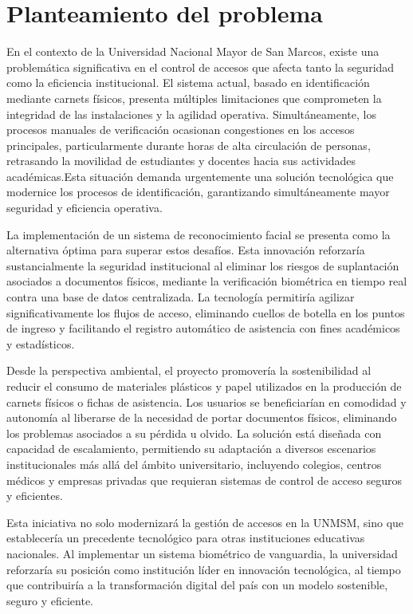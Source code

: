 \documentclass[12pt]{article}
\begin{document}
{%
\section{Planteamiento del problema}
En el contexto de la Universidad Nacional Mayor de San Marcos, existe una problemática significativa en el control de accesos que afecta tanto la seguridad como la eficiencia institucional. El sistema actual, basado en identificación mediante carnets físicos, presenta múltiples limitaciones que comprometen la integridad de las instalaciones y la agilidad operativa. Simultáneamente, los procesos manuales de verificación ocasionan congestiones en los accesos principales, particularmente durante horas de alta circulación de personas, retrasando la movilidad de estudiantes y docentes hacia sus actividades académicas.Esta situación demanda urgentemente una solución tecnológica que modernice los procesos de identificación, garantizando simultáneamente mayor seguridad y eficiencia operativa.

La implementación de un sistema de reconocimiento facial se presenta como la alternativa óptima para superar estos desafíos. Esta innovación reforzaría sustancialmente la seguridad institucional al eliminar los riesgos de suplantación asociados a documentos físicos, mediante la verificación biométrica en tiempo real contra una base de datos centralizada. La tecnología permitiría agilizar significativamente los flujos de acceso, eliminando cuellos de botella en los puntos de ingreso y facilitando el registro automático de asistencia con fines académicos y estadísticos.

Desde la perspectiva ambiental, el proyecto promovería la sostenibilidad al reducir el consumo de materiales plásticos y papel utilizados en la producción de carnets físicos o fichas de asistencia. Los usuarios se beneficiarían en comodidad y autonomía al liberarse de la necesidad de portar documentos físicos, eliminando los problemas asociados a su pérdida u olvido. La solución está diseñada con capacidad de escalamiento, permitiendo su adaptación a diversos escenarios institucionales más allá del ámbito universitario, incluyendo colegios, centros médicos y empresas privadas que requieran sistemas de control de acceso seguros y eficientes.

Esta iniciativa no solo modernizará la gestión de accesos en la UNMSM, sino que establecería un precedente tecnológico para otras instituciones educativas nacionales. Al implementar un sistema biométrico de vanguardia, la universidad reforzaría su posición como institución líder en innovación tecnológica, al tiempo que contribuiría a la transformación digital del país con un modelo sostenible, seguro y eficiente.


}
\end{document}
